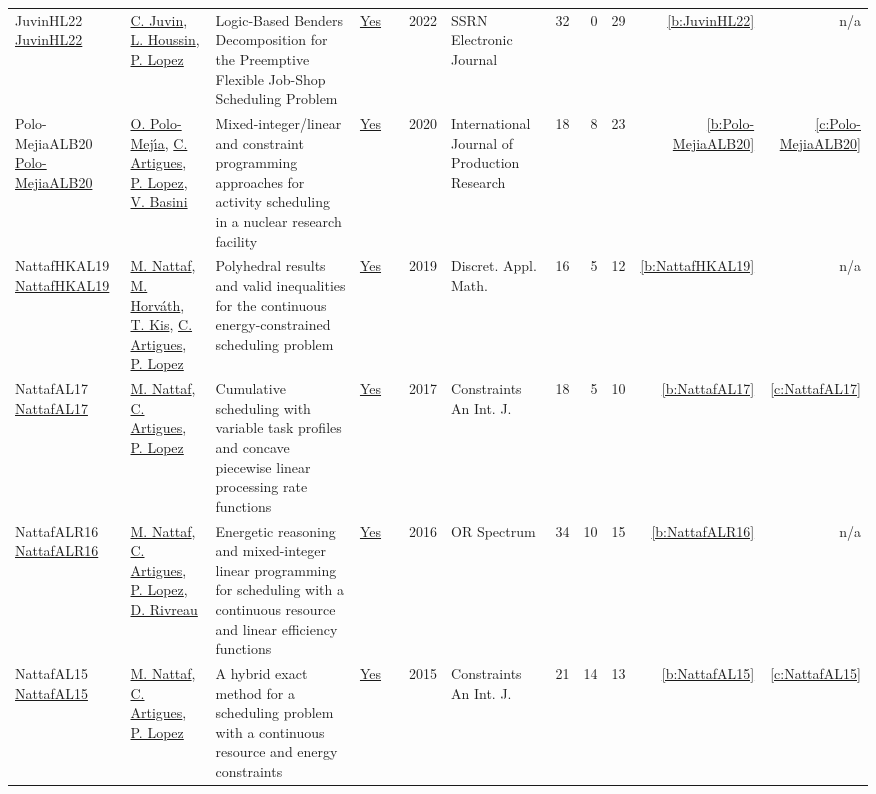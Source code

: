 {\begin{longtable}{>{\raggedright\arraybackslash}p{3cm}>{\raggedright\arraybackslash}p{6cm}>{\raggedright\arraybackslash}p{6.5cm}rrrp{2.5cm}rrrrr}
JuvinHL22 \href{http://dx.doi.org/10.2139/ssrn.4068164}{JuvinHL22} & \hyperref[auth:a0]{C. Juvin}, \hyperref[auth:a2]{L. Houssin}, \hyperref[auth:a3]{P. Lopez} & Logic-Based Benders Decomposition for the Preemptive Flexible Job-Shop Scheduling Problem & \href{../works/JuvinHL22.pdf}{Yes} & \cite{JuvinHL22} & 2022 & SSRN Electronic Journal & 32 & 0 & 29 & \ref{b:JuvinHL22} & n/a\\
Polo-MejiaALB20 \href{https://doi.org/10.1080/00207543.2019.1693654}{Polo-MejiaALB20} & \hyperref[auth:a520]{O. Polo{-}Mej{\'{\i}}a}, \hyperref[auth:a6]{C. Artigues}, \hyperref[auth:a3]{P. Lopez}, \hyperref[auth:a521]{V. Basini} & Mixed-integer/linear and constraint programming approaches for activity scheduling in a nuclear research facility & \href{../works/Polo-MejiaALB20.pdf}{Yes} & \cite{Polo-MejiaALB20} & 2020 & International Journal of Production Research & 18 & 8 & 23 & \ref{b:Polo-MejiaALB20} & \ref{c:Polo-MejiaALB20}\\
NattafHKAL19 \href{https://doi.org/10.1016/j.dam.2018.11.008}{NattafHKAL19} & \hyperref[auth:a81]{M. Nattaf}, \hyperref[auth:a1009]{M. Horv{\'{a}}th}, \hyperref[auth:a156]{T. Kis}, \hyperref[auth:a6]{C. Artigues}, \hyperref[auth:a3]{P. Lopez} & Polyhedral results and valid inequalities for the continuous energy-constrained scheduling problem & \href{../works/NattafHKAL19.pdf}{Yes} & \cite{NattafHKAL19} & 2019 & Discret. Appl. Math. & 16 & 5 & 12 & \ref{b:NattafHKAL19} & n/a\\
NattafAL17 \href{https://doi.org/10.1007/s10601-017-9271-4}{NattafAL17} & \hyperref[auth:a81]{M. Nattaf}, \hyperref[auth:a6]{C. Artigues}, \hyperref[auth:a3]{P. Lopez} & Cumulative scheduling with variable task profiles and concave piecewise linear processing rate functions & \href{../works/NattafAL17.pdf}{Yes} & \cite{NattafAL17} & 2017 & Constraints An Int. J. & 18 & 5 & 10 & \ref{b:NattafAL17} & \ref{c:NattafAL17}\\
NattafALR16 \href{https://doi.org/10.1007/s00291-015-0423-x}{NattafALR16} & \hyperref[auth:a81]{M. Nattaf}, \hyperref[auth:a6]{C. Artigues}, \hyperref[auth:a3]{P. Lopez}, \hyperref[auth:a991]{D. Rivreau} & Energetic reasoning and mixed-integer linear programming for scheduling with a continuous resource and linear efficiency functions & \href{../works/NattafALR16.pdf}{Yes} & \cite{NattafALR16} & 2016 & {OR} Spectrum & 34 & 10 & 15 & \ref{b:NattafALR16} & n/a\\
NattafAL15 \href{https://doi.org/10.1007/s10601-015-9192-z}{NattafAL15} & \hyperref[auth:a81]{M. Nattaf}, \hyperref[auth:a6]{C. Artigues}, \hyperref[auth:a3]{P. Lopez} & A hybrid exact method for a scheduling problem with a continuous resource and energy constraints & \href{../works/NattafAL15.pdf}{Yes} & \cite{NattafAL15} & 2015 & Constraints An Int. J. & 21 & 14 & 13 & \ref{b:NattafAL15} & \ref{c:NattafAL15}\\

\end{longtable}}

